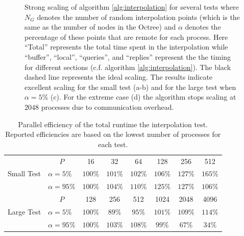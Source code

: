 \begin{figure}[htbp]
\begin{center}
	\end{center}
	\caption{Strong scaling of algorithm \ref{alg:interpolation} for several tests where $N_G$ denotes the number of random interpolation points (which is the same as the number of nodes in the Octree) and $\alpha$ denotes the percentage of these points that are remote for each process. Here ``Total'' represents the total time spent in the interpolation while ``buffer'', ``local'', ``queries'', and ``replies'' represent the the timing for different sections (c.f. algorithm \ref{alg:interpolation}). The black dashed line represents the ideal scaling. The results indicate excellent scaling for the small test (a-b) and for the large test when $\alpha = 5\%$ (c). For the extreme case (d) the algorithm stops scaling at $2048$ processes due to communication overhead.}
	\label{fig:interpolation}
\end{figure}

\begin{table}
\centering
	\begin{tabular}{|l|l|cccccc|}
	\hline
	\multirow{3}{*}{Small Test} & \multicolumn{1}{|c|}{$P$} & 16      & 32      & 64      & 128     & 256    & 512 \\
	\cline{2-8} 	                            
	                            & $\alpha = 5\%$   & $100\%$ & $101\%$ & $102\%$ & $106\%$ & $127\%$& $165\%$ \\
	                            & $\alpha = 95\%$  & $100\%$ & $104\%$ & $110\%$ & $125\%$ & $127\%$& $106\%$ \\ 	                            
	\hline
	\multirow{3}{*}{Large Test} & \multicolumn{1}{|c|}{$P$} & 128     & 256     & 512     & 1024    & 2048   & 4096 \\
	\cline{2-8} 	                            
	                            & $\alpha = 5\%$   & $100\%$ & $89\%$  & $95\%$  & $101\%$ & $109\%$& $114\%$ \\
	                            & $\alpha = 95\%$  & $100\%$ & $103\%$ & $108\%$ & $99\%$  & $67\%$ & $34\%$ \\
	\hline
	\end{tabular}
	\caption{Parallel efficiency of the total runtime the interpolation test. Reported efficiencies are based on the lowest number of processes for each test.}
	\label{tab:scaling_interpolation}
\end{table}

